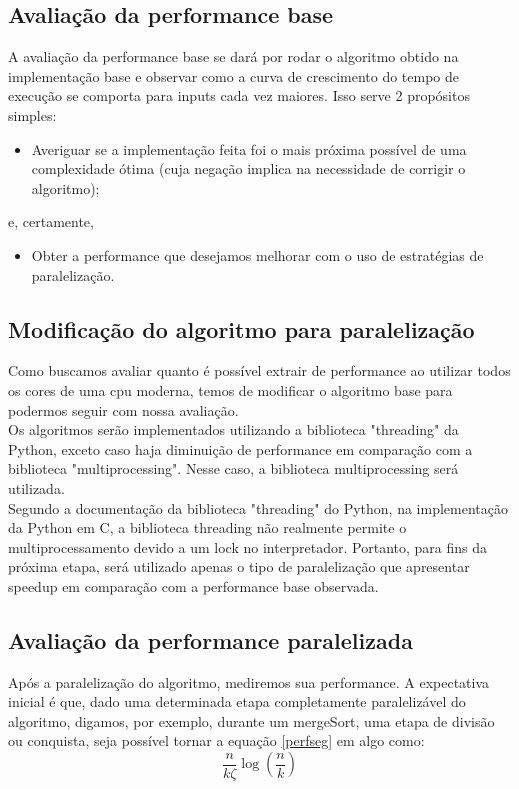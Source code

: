 \documentclass{article}
\begin{document}
\subsection{Avaliação da performance base}
A avaliação da performance base se dará por rodar o algoritmo obtido na implementação base e observar como a curva de crescimento do tempo de execução se comporta para inputs cada vez maiores. Isso serve 2 propósitos simples:
\begin{itemize}
    \item Averiguar se a implementação feita foi o mais próxima possível de uma complexidade ótima (cuja negação implica na necessidade de corrigir o algoritmo);
\end{itemize}
e, certamente,
\begin{itemize}
    \item Obter a performance que desejamos melhorar com o uso de estratégias de paralelização.
\end{itemize}

\subsection{Modificação do algoritmo para paralelização}
Como buscamos avaliar quanto é possível extrair de performance ao utilizar todos os cores de uma cpu moderna, temos de modificar o algoritmo base para podermos seguir com nossa avaliação.\\
Os algoritmos serão implementados utilizando a biblioteca "threading" da Python, exceto caso haja diminuição de performance em comparação com a biblioteca "multiprocessing". Nesse caso, a biblioteca multiprocessing será utilizada.\\
Segundo a documentação da biblioteca "threading" do Python, na implementação da Python em C, a biblioteca threading não realmente permite o multiprocessamento devido a um lock no interpretador. Portanto, para fins da próxima etapa, será utilizado apenas o tipo de paralelização que apresentar speedup em comparação com a performance base observada.\\

\subsection{Avaliação da performance paralelizada}
Após a paralelização do algoritmo, mediremos sua performance. A expectativa inicial é que, dado uma determinada etapa completamente paralelizável do algoritmo, digamos, por exemplo, durante um mergeSort, uma etapa de divisão ou conquista, seja possível tornar a equação \eqref{perfseg} em algo como: 
    \begin{equation}
        \frac{n}{k\zeta} \log(\frac{n}{k})
    \end{equation}
\end{document}
